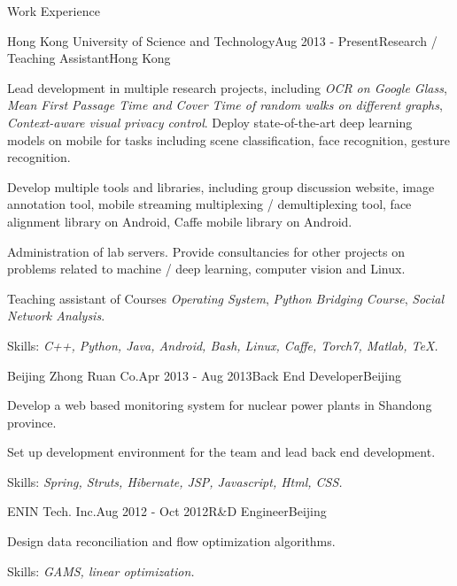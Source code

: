 \documentclass{resume} %
\begin{document}
\begin{rSection}{Work Experience}

\begin{rSubsection}{Hong Kong University of Science and Technology}{Aug 2013 - Present}{Research / Teaching Assistant}{Hong Kong}
\item Lead development in multiple research projects, including {\it OCR on Google Glass}, {\it Mean First Passage Time and Cover Time of random walks on different graphs}, {\it Context-aware visual privacy control}. Deploy state-of-the-art deep learning models on mobile for tasks including scene classification, face recognition, gesture recognition.

\item Develop multiple tools and libraries, including group discussion website, image annotation tool, mobile streaming multiplexing / demultiplexing tool, face alignment library on Android, Caffe mobile library on Android.

\item Administration of lab servers. Provide consultancies for other projects on problems related to machine / deep learning, computer vision and Linux.

\item Teaching assistant of Courses {\it Operating System}, {\it Python Bridging Course}, {\it Social Network Analysis}.

\item Skills: {\it C++, Python, Java, Android, Bash, Linux, Caffe, Torch7, Matlab, \TeX.}
\end{rSubsection}


\begin{rSubsection}{Beijing Zhong Ruan Co.}{Apr 2013 - Aug 2013}{Back End Developer}{Beijing}
\item Develop a web based monitoring system for nuclear power plants in Shandong province.
\item Set up development environment for the team and lead back end development.
\item Skills: {\it Spring, Struts, Hibernate, JSP, Javascript, Html, CSS.}
\end{rSubsection}

\begin{rSubsection}{ENIN Tech. Inc.}{Aug 2012 - Oct 2012}{R\&D Engineer}{Beijing}
\item Design data reconciliation and flow optimization algorithms.
\item Skills: {\it GAMS, linear optimization.}
\end{rSubsection}


\end{rSection}
\end{document}
